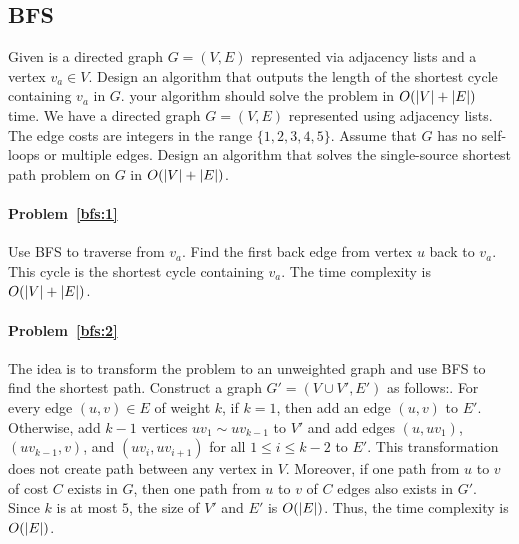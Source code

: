 \subsection{BFS}

\begin{Exercise}
\Question Given is a directed graph $G = (V, E)$ represented via adjacency lists and a vertex $v_a \in V$. Design an algorithm that outputs the length of the shortest cycle containing $v_a$ in $G$. your algorithm should solve the problem in $O(\lvert V\rvert + \lvert E\rvert)$ time. \label{bfs:1}
\Question We have a directed graph $G = (V, E)$ represented using adjacency lists. The edge costs are integers in the range $\{1, 2, 3, 4, 5\}$. Assume that $G$ has no self-loops or multiple edges. Design an algorithm that solves the single-source shortest path problem on $G$ in $O(\lvert V\rvert+\lvert E\rvert)$. \label{bfs:2}
\end{Exercise}
\begin{Answer}
\paragraph{Problem~\ref{bfs:1}}
Use BFS to traverse from $v_a$. Find the first back edge from vertex $u$ back to $v_a$. This cycle is the shortest cycle containing $v_a$. The time complexity is $O(\lvert V\rvert + \lvert E\rvert)$.

\paragraph{Problem~\ref{bfs:2}}
The idea is to transform the problem to an unweighted graph and use BFS to find the shortest path. Construct a graph $G' = (V \cup V', E')$ as follows:. For every edge $(u, v) \in E$ of weight $k$, if $k = 1$, then add an edge $(u, v)$ to $E'$. Otherwise, add $k-1$ vertices $uv_1 \sim uv_{k-1}$ to $V'$ and add edges $(u, uv_1)$, $(uv_{k-1}, v)$, and $(uv_i, uv_{i+1})$ for all $1 \leq i \leq k-2$ to $E'$. This transformation does not create path between any vertex in $V$. Moreover, if one path from $u$ to $v$ of cost $C$ exists in $G$, then one path from $u$ to $v$ of $C$ edges also exists in $G'$. Since $k$ is at most $5$, the size of $V'$ and $E'$ is $O(\lvert E\rvert)$. Thus, the time complexity is $O(\lvert E\rvert)$.
\end{Answer}

